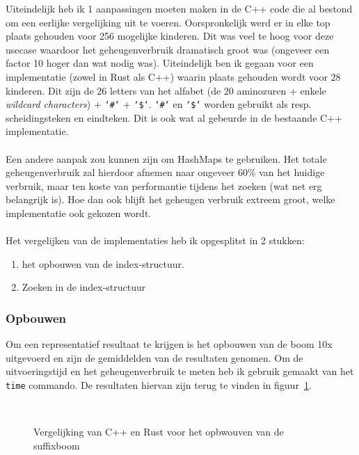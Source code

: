 Uiteindelijk heb ik 1 aanpassingen moeten maken in de C++ code die al bestond om een eerlijke vergelijking uit te voeren.
Oorspronkelijk werd er in elke top plaats gehouden voor 256 mogelijke kinderen.
Dit was veel te hoog voor deze usecase waardoor het geheugenverbruik dramatisch groot was (ongeveer een factor 10 hoger dan wat nodig was).
Uiteindelijk ben ik gegaan voor een implementatie (zowel in Rust als C++) waarin plaats gehouden wordt voor 28 kinderen.
Dit zijn de 26 letters van het alfabet (de 20 aminozuren + enkele \textit{wildcard characters}) + \texttt{`\#`} + \texttt{`\$`}.
\texttt{`\#`} en \texttt{`\$`} worden gebruikt als resp. scheidingsteken en eindteken.
Dit is ook wat al gebeurde in de bestaande C++ implementatie.
\\ \\
Een andere aanpak zou kunnen zijn om HashMaps te gebruiken.
Het totale geheugenverbruik zal hierdoor afnemen naar ongeveer 60\% van het huidige verbruik, maar ten koste van performantie tijdens het zoeken (wat net erg belangrijk is).
Hoe dan ook blijft het geheugen verbruik extreem groot, welke implementatie ook gekozen wordt.
\\ \\
Het vergelijken van de implementaties heb ik opgesplitst in 2 stukken:
\begin{enumerate}
    \item het opbouwen van de index-structuur.
    \item Zoeken in de index-structuur
\end{enumerate}

\subsubsection{Opbouwen}
Om een representatief resultaat te krijgen is het opbouwen van de boom 10x uitgevoerd en zijn de gemiddelden van de resultaten genomen.
Om de uitvoeringstijd en het geheugenverbruik te meten heb ik gebruik gemaakt van het \texttt{time} commando.
De resultaten hiervan zijn terug te vinden in figuur~\ref{fig:tree_building}.
\begin{figure}[H]
    \centering
    \\[4ex] %

    \caption{Vergelijking van C++ en Rust voor het opbwouven van de suffixboom}\label{fig:tree_building}
\end{figure}

